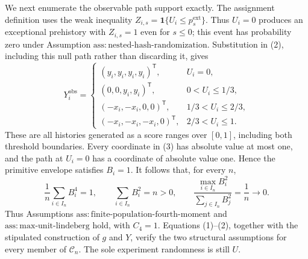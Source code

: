 We next enumerate the observable path support exactly.  The assignment definition uses the weak inequality \(Z_{i,s}=\mathbf 1\{U_i\le p_s^{\mathrm{ext}}\}\).  Thus \(U_i=0\) produces an exceptional prehistory with \(Z_{i,s}=1\) even for \(s\le0\); this event has probability zero under Assumption \(\mathrm{ass:nested\text{-}hash\text{-}randomization}\).  Substitution in (2), including this null path rather than discarding it, gives
\[
Y_i^{\mathrm{obs}}=
\begin{cases}
(y_i,y_i,y_i,y_i)^{\mathsf T},&U_i=0,\\
(0,0,y_i,y_i)^{\mathsf T},&0<U_i\le1/3,\\
(-x_i,-x_i,0,0)^{\mathsf T},&1/3<U_i\le2/3,\\
(-x_i,-x_i,-x_i,0)^{\mathsf T},&2/3<U_i\le1.
\end{cases}
\tag{3}
\]
These are all histories generated as a score ranges over \([0,1]\), including both threshold boundaries.  Every coordinate in (3) has absolute value at most one, and the path at \(U_i=0\) has a coordinate of absolute value one.  Hence the primitive envelope satisfies \(B_i=1\).  It follows that, for every \(n\),
\[
\frac1n\sum_{i\in I_n}B_i^4=1,
\qquad
\sum_{i\in I_n}B_i^2=n>0,
\qquad
\frac{\max_{i\in I_n}B_i^2}{\sum_{j\in I_n}B_j^2}
=\frac1n\longrightarrow0.
\tag{4}
\]
Thus Assumptions \(\mathrm{ass:finite\text{-}population\text{-}fourth\text{-}moment}\) and \(\mathrm{ass:max\text{-}unit\text{-}lindeberg}\) hold, with \(C_4=1\).  Equations (1)--(2), together with the stipulated construction of \(g\) and \(Y\), verify the two structural assumptions for every member of \(\mathcal C_n\).  The sole experiment randomness is still \(U\).

